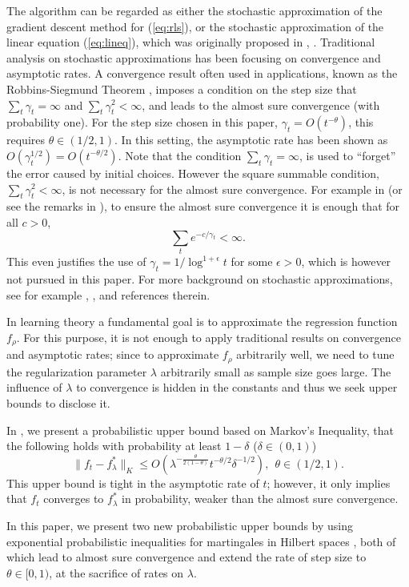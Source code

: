 \documentclass[twoside,twocolumn,journal]{IEEEtran}
\begin{document}
The algorithm can be regarded as either the stochastic approximation of
the gradient descent method for (\ref{eq:rls}), or
the stochastic approximation of the linear equation (\ref{eq:lineq}),
which was originally proposed in \cite{RobMon51}, \cite{KieWol52}.
Traditional analysis on stochastic approximations has been
focusing on convergence and asymptotic rates. A convergence result
often used in applications, known as the Robbins-Siegmund Theorem
\cite{RobSie71}, imposes a condition on the step size that $\sum_t
\gamma_t = \infty$ and $\sum_t \gamma_t^2<\infty$, and leads to
the almost sure convergence (with probability one). For the step size
chosen in this paper, $\gamma_t = O(t^{-\theta})$, this requires
$\theta\in(1/2,1)$. In this setting, the asymptotic rate has been
shown as $O(\gamma_t^{1/2})=O(t^{-\theta/2})$. Note that the
condition $\sum_t \gamma_t = \infty$, is used to ``forget'' the
error caused by initial choices. However the square summable
condition, $\sum_t \gamma_t^2<\infty$, is not necessary for
the almost sure convergence. For example in \cite{Duflo97} (or see the
remarks in \cite{Benaim99}), to ensure the almost sure convergence
it is enough that for all $c>0$,
\[ \sum_{t} e^{-c/\gamma_t} < \infty. \]
This even justifies the use of
$\gamma_t = 1/\log^{1+\epsilon} t$ for some $\epsilon>0$, which is however not pursued in this paper. For more background on stochastic
approximations, see for example \cite{Duflo96}, \cite{KusYin03}, and references therein.

In learning theory a fundamental goal is to approximate the regression function $f_\rho$. For this purpose, it is not enough to apply traditional results
on convergence and asymptotic rates; since to approximate $f_\rho$ arbitrarily well, we need to tune the regularization parameter $\lambda$ arbitrarily
small as sample size goes large. The influence of $\lambda$ to convergence is hidden in the constants and thus we seek upper bounds to disclose it.

In \cite{SmaYao04}, we present a probabilistic upper bound based on Markov's Inequality, that the following holds
with probability at least $1-\delta$ ($\delta\in (0,1)$)
\[ \|f_t-f^\ast_\lambda\|_K \leq O(\lambda^{-\frac{\theta}{2(1-\theta)}} t^{-\theta/2} \delta^{-1/2}),\ \ \mbox{$\theta\in(1/2,1)$}. \]
This upper bound is tight in the asymptotic rate of $t$; however, it only implies that $f_t$ converges to
$f^\ast_\lambda$ in probability, weaker than the almost sure convergence.

In this paper, we present two new probabilistic upper bounds by using exponential probabilistic inequalities for martingales in Hilbert spaces
\cite{Pinelis94}, both of which lead to almost sure convergence and extend the rate of step size to $\theta\in [0,1)$, at the sacrifice of rates on
$\lambda$.
\end{document}
